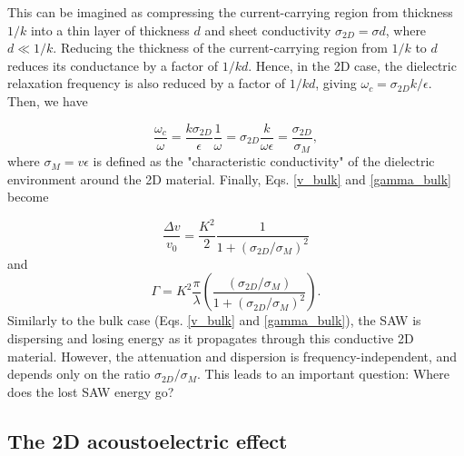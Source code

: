 \documentclass[double,12pt,1in]{beavtex}
\begin{document}
This can be imagined as compressing the current-carrying region from thickness $1/k$ into a thin layer of thickness $d$ and sheet conductivity $\sigma_{2D} = \sigma d$, where $d \ll 1/k$. Reducing the thickness of the current-carrying region from $1/k$ to $d$ reduces its conductance by a factor of $1/kd$. Hence, in the 2D case, the dielectric relaxation frequency is also reduced by a factor of $1/kd$, giving $\omega_c = \sigma_{2D}k/\epsilon$. Then, we have
 
\begin{equation}
    \frac{\omega_c}{\omega} = \frac{k\sigma_{2D}}{\epsilon}\frac{1}{\omega} = \sigma_{2D}\frac{k}{\omega \epsilon} = \frac{\sigma_{2D}}{\sigma_M},
\end{equation}
where $\sigma_M = v \epsilon$ is defined as the "characteristic conductivity" of the dielectric environment around the 2D material. Finally, Eqs. \ref{v_bulk} and \ref{gamma_bulk} become

\begin{equation}
    \frac{\Delta v}{v_0} = \frac{K^2}{2}\frac{1}{1+(\sigma_{2D}/\sigma_M)^2} \label{v_2D}
\end{equation}
and
\begin{equation}
    \Gamma = K^2 \frac{\pi}{\lambda}\left(\frac{(\sigma_{2D}/\sigma_M)}{1+(\sigma_{2D}/\sigma_M)^2}\right). \label{gamma_2D}
\end{equation}
Similarly to the bulk case (Eqs. \ref{v_bulk} and \ref{gamma_bulk}), the SAW is dispersing and losing energy as it propagates through this conductive 2D material. However, the attenuation and dispersion is frequency-independent, and depends only on the ratio $\sigma_{2D}/\sigma_M$. This leads to an important question: Where does the lost SAW energy go? 


\subsection{The 2D acoustoelectric effect}

\end{document}
